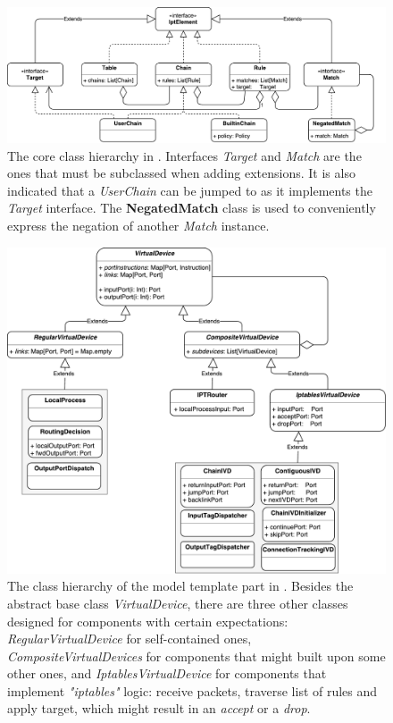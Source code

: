 \begin{figure}[h]
  \centering

  \includegraphics[scale=0.5]{assets/img/ipt-hierarchy}
  \caption[The core class hierarchy in \TOOL.]{The core class hierarchy in
  \TOOL.  Interfaces \emph{Target} and \emph{Match} are the ones that must be
  subclassed when adding extensions.  It is also indicated that a
  \emph{UserChain} can be jumped to as it implements the \emph{Target}
  interface.  The \textbf{NegatedMatch} class is used to conveniently express
  the negation of another \emph{Match} instance.}
  \label{fig:ipt-hierarchy}
\end{figure}

\begin{figure}[h]
  \centering

  \includegraphics[scale=0.55]{assets/img/virtdev-hierarchy}
  \caption[The class hierarchy that defines the model template part in
  \TOOL.]{The class hierarchy of the model template part in \TOOL. Besides the
  abstract base class \emph{VirtualDevice}, there are three other classes
  designed for components with certain expectations:
  \emph{RegularVirtualDevice} for self-contained ones,
  \emph{CompositeVirtualDevices} for components that might built upon some
  other ones, and \emph{IptablesVirtualDevice} for components that implement
  \emph{"iptables"} logic: receive packets, traverse list of rules and apply
  target, which might result in an \emph{accept} or a \emph{drop}.}
  \label{fig:virtdev-hierarchy}
\end{figure}

